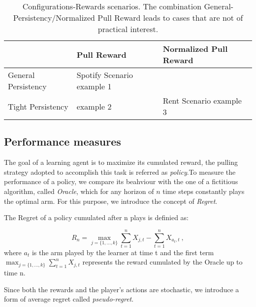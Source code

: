 \begin{table}

\begin{center}
	\caption{Configurations-Rewards scenarios. The combination General-Persistency/Normalized Pull Reward leads to cases that are not of practical interest.}\label{tabNF}
	\begin{tabularx}{0.8\textwidth} { 
			| >{\raggedright\arraybackslash}X 
			| >{\centering\arraybackslash}X 
			| >{\centering\arraybackslash}X | }
		\hline
		  & Pull Reward & Normalized Pull Reward \\
		\hline
		General Persistency  &  Spotify Scenario example 1 &   \\
		\hline
		Tight Persistency  & example 2  & 
			    Rent Scenario example 3
			 \\
		\hline		
	\end{tabularx}	
\end{center}

\end{table}




\subsection{ Performance measures}
The goal of a learning agent is to maximize its cumulated reward, the pulling strategy adopted to accomplish this task is referred as \emph{policy}.To measure the performance of a policy, we compare its beahviour with the one of a fictitious algorithm, called \emph{Oracle}, which for any horizon of $n$ time steps constantly plays the optimal arm. For this purpose, we introduce the concept of \emph{Regret}.
\begin{definition}[Regret]
	The Regret of a policy cumulated after n plays is definied as:
	
		$$R_n=\max_{j = \{1,\dots,k\}} \sum_{t=1}^n{X_{j,t}} - \sum_{t=1}^{n} X_{a_t,t}  \ ,$$
where  $a_t$ is the arm played by the learner at time t and the first term \ $\max_{j = \{1,\dots,k\}}\sum_{t=1}^n{X_{j,t}}$ represents the reward cumulated by the Oracle up to time n.

\end{definition}
Since both the rewards and the player's actions are stochastic, we introduce a form of average regret called \emph{pseudo-regret}.

